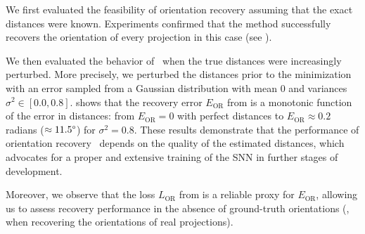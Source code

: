 We first evaluated the feasibility of orientation recovery assuming that the exact distances were known.
Experiments confirmed that the method successfully recovers the orientation of every projection in this case (see ).

We then evaluated the behavior of~ when the true distances were increasingly perturbed.
More precisely, we perturbed the distances prior to the minimization with an error sampled from a Gaussian distribution with mean $0$ and variances $\sigma^2 \in [0.0, 0.8]$.
 shows that the recovery error $E_\text{OR}$ from  is a monotonic function of the error in distances: from $E_\text{OR} = 0$ with perfect distances to $E_\text{OR} \approx 0.2$ radians ($\approx 11.5\degree$) for $\sigma^2 = 0.8$.
These results demonstrate that the performance of orientation recovery~ depends on the quality of the estimated distances, which advocates for a proper and extensive training of the SNN in further stages of development.

Moreover, we observe that the loss $L_\text{OR}$ from  is a reliable proxy for $E_\text{OR}$, allowing us to assess recovery performance in the absence of ground-truth orientations (\ie, when recovering the orientations of real projections).

